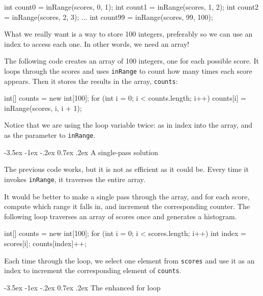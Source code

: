 \documentclass[12pt]{book}
\makeatletter
\theoremstyle{exercise}
\newcommand{\java}[1]{\verb"#1"}
\renewcommand{\section}{\@startsection{section}{1}{\z@}%
    {-3.5ex \@plus -1ex \@minus -.2ex}%
    {0.7ex \@plus.2ex}%
    {\normalfont\Large\bfseries}}
\newcommand{\java}[1]{\lstinline{#1}} %
\makeatother
\begin{document}
\begin{code}
    int count0 = inRange(scores, 0, 1);
    int count1 = inRange(scores, 1, 2);
    int count2 = inRange(scores, 2, 3);
    ...
    int count99 = inRange(scores, 99, 100);
\end{code}

What we really want is a way to store 100 integers, preferably so we can use an index to access each one.
In other words, we need an array!

The following code creates an array of 100 integers, one for each possible score.
It loops through the scores and uses \java{inRange} to count how many times each score appears.
Then it stores the results in the array, \java{counts}:

\begin{code}
    int[] counts = new int[100];
    for (int i = 0; i < counts.length; i++) {
        counts[i] = inRange(scores, i, i + 1);
    }
\end{code}

Notice that we are using the loop variable twice: as in index into the array, and as the parameter to \java{inRange}.


\section{A single-pass solution}
\label{singlepass}

The previous code works, but it is not as efficient as it could be.
Every time it invokes \java{inRange}, it traverses the entire array.

It would be better to make a single pass through the array, and for each score, compute which range it falls in, and increment the corresponding counter.
The following loop traverses an array of scores once and generates a histogram.

\begin{code}
    int[] counts = new int[100];
    for (int i = 0; i < scores.length; i++) {
        int index = scores[i];
        counts[index]++;
    }
\end{code}

Each time through the loop, we select one element from \java{scores} and use it as an index to increment the corresponding element of \java{counts}.


\section{The enhanced for loop}
\end{document}
